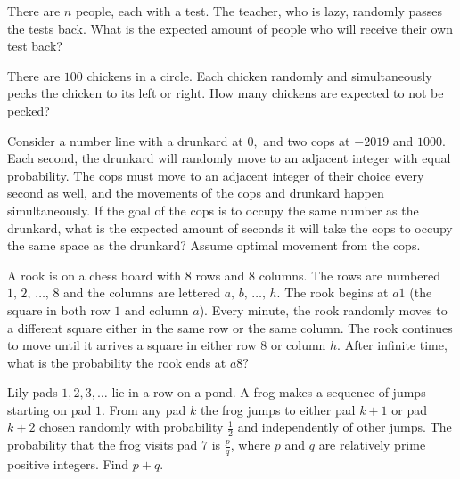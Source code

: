 \documentclass{article}
\begin{document}




    \begin{prob}[]{1}
 There are $n$ people, each with a test. The teacher, who is lazy, randomly passes the tests back. What is the expected amount of people who will receive their own test back?
\end{prob}

    \begin{prob}[MATHCOUNTS 2017]{1}
There are $100$ chickens in a circle. Each chicken randomly and simultaneously pecks the chicken to its left or right. How many chickens are expected to not be pecked?
\end{prob}

\begin{prob}[]{2}
Consider a number line with a drunkard at $0,$ and two cops at $-2019$ and $1000.$ Each second, the drunkard will randomly move to an adjacent integer with equal probability. The cops must move to an adjacent integer of their choice every second as well, and the movements of the cops and drunkard happen simultaneously. If the goal of the cops is to occupy the same number as the drunkard, what is the expected amount of seconds it will take the cops to occupy the same space as the drunkard? Assume optimal movement from the cops.
\end{prob}

\begin{prob}[SMT 2020]{2}
 A rook is on a chess board with $8$ rows and $8$ columns. The rows are numbered $1,\, 2,\, \ldots,\, 8$ and the columns are lettered $a,\, b,\, \ldots,\, h.$ The rook begins at $a1$ (the square in both row $1$ and column $a$). Every minute, the rook randomly moves to a different square either in the same row or the same column. The rook continues to move until it arrives a square in either row $8$ or column $h.$ After infinite time, what is the probability the rook ends at $a8?$
\end{prob}

\begin{prob}[AIME II 2019/2]{2}
 Lily pads $1,2,3,\ldots$ lie in a row on a pond. A frog makes a sequence of jumps starting on pad $1$. From any pad $k$ the frog jumps to either pad $k+1$ or pad $k+2$ chosen randomly with probability $\tfrac{1}{2}$ and independently of other jumps. The probability that the frog visits pad $7$ is $\tfrac{p}{q}$, where $p$ and $q$ are relatively prime positive integers. Find $p+q$.
\end{prob}
\end{document}
